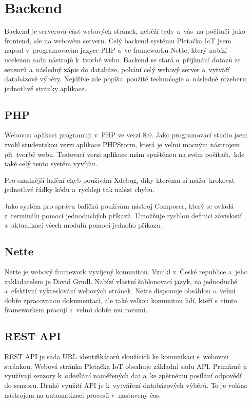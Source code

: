 \section{Backend}
Backend je serverová část webových stránek, neběží tedy u~vás~na počítači~jako frontend, ale na webovém serveru.   
Celý backend systému Pletačka IoT jsem napsal v~programovacím jazyce PHP a~ve frameworku Nette\cite{NETTE}, který nabízí ucelenou sadu nástrojů k~tvorbě webu.
Backend se stará o~přijímání dotazů ze senzorů a~následný zápis do databáze, pohání celý webový server a~vytváří databázové výběry.
Nejdříve zde popíšu~použité technologie a~následně rozeberu jednotlivé stránky aplikace.

\subsection{PHP}
Webovou aplikaci programuji v~PHP ve verzi 8.0. Jako programovací studio jsem zvolil studentskou verzi aplikace PHPStorm, která je velmi mocným nástrojem při~tvorbě webu.
Testovací verzi aplikace mám spuštěnou na svém počítači,~kde také celý tento systém vyvíjím. 

Pro snadnější ladění chyb používám Xdebug, díky kterému si můžu~krokovat jednotlivé řádky kódu a~rychleji tak nalézt chybu.

Jako systém pro správu balíčků používám nástroj Composer, který se ovládá z~terminálu pomocí jednoduchých příkazů.
Umožňuje rychlou definici závislostí a~aktualizaci všech modulů pomocí jednoho příkazu.


\subsection{Nette}
Nette je webový framework vyvíjený komunitou. Vznikl v~České republice a~jeho zakladatelem je David Grudl. 
Nabízí vlastní šablonovací jazyk, na jednoduché a~efektivní vykreslování webových stránek. 
Nette disponuje obsáhlou a~velmi dobře zpracovanou dokumentací, ale také velkou komunitou lidí, kteří s~tímto frameworkem pracují a~velmi dobře mu rozumí. 


\subsection{REST API}

REST API je sada URL identifikátorů sloužících ke komunikaci s~webovou stránkou.
Webová stránka Pletačka IoT obsahuje základní sadu API.
Primárně ji využívají senzory k~odesílání naměřených dat a~ke zpětnému posílání odpovědí do senzoru.
Druhé využití API je k~vytváření databázových výběrů. 
To je voláno nástrojem na automatizaci procesů v~nastavený čas.

